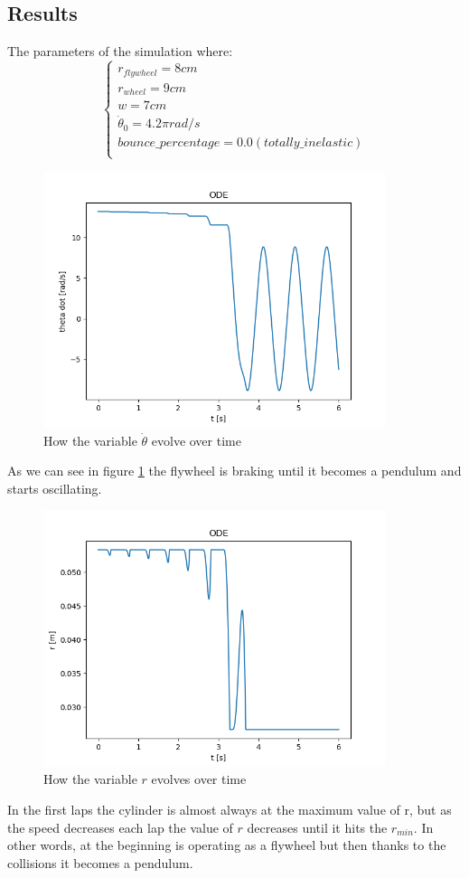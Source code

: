 \subsection{Results}
The parameters of the simulation where:
\[
\begin{cases}
	r_{flywheel} = 8cm \\
	r_{wheel} = 9cm \\
	w = 7 cm \\
	\dot{\theta}_0 = 4.2 \pi rad/s \\
	bounce\_percentage = 0.0 (totally\_inelastic) \\	
\end{cases}	
\]
\begin{figure}[H]
	\centering
	\includegraphics[width=10cm]{img/simulation/d_theta_t.png}
	\caption{How the variable $\dot{\theta}$ evolve over time}
	\label{fig:d theta t diagram}
\end{figure}
As we can see in figure \ref{fig:d theta t diagram} the flywheel is braking until it becomes a pendulum and starts oscillating.

\begin{figure}[H]
	\centering
	\includegraphics[width=10cm]{img/simulation/r_t.png}
	\caption{How the variable $r$ evolves over time}
	\label{fig:r t diagram}
\end{figure}
In the first laps the cylinder is almost always at the maximum value of r, but as the
speed decreases each lap the value of $r$ decreases until it hits the $r_{min}$.
In other words, at the beginning is operating as a flywheel but then thanks to the
collisions it becomes a pendulum.

